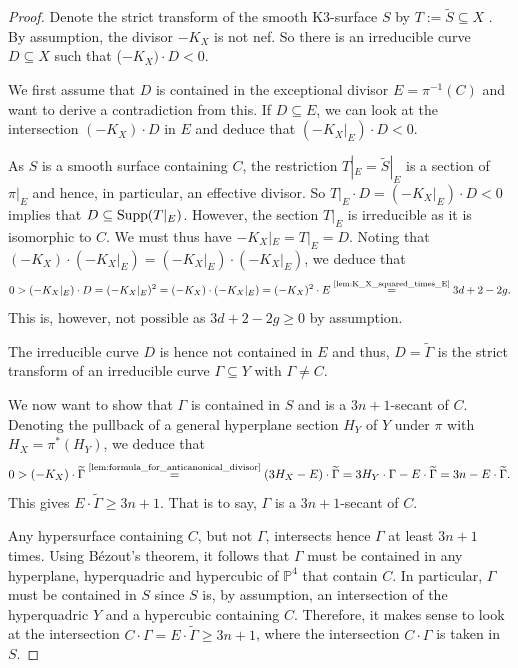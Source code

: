 \documentclass[english,11pt,reqno]{amsart}
\newcommand{\sub}{\subseteq}
\newcommand{\Pfour}{\mathbb{P}^4}
\newcommand{\supp}{\textup{Supp}}
\begin{document}
%
\begin{proof}
Denote the strict transform of the smooth K3-surface $S$ by $T:=\widetilde{S}\sub X$ . By assumption, the divisor $-K_X$ is not nef. So there is an irreducible curve $D\sub X$ such that ($-K_X)\cdot D <0$.\par
We first assume that $D$ is contained in the exceptional divisor $E=\pi^{-1}(C)$ and want to derive a contradiction from this. If $D\sub E$, we can look at the intersection $(-K_X) \cdot D$ in $E$ and deduce that $(-K_X|_E)\cdot D <0$.\par
As $S$ is a smooth surface containing $C$, the restriction $T|_E=\widetilde{S}|_E$ is a section of $\pi|_E$ and hence, in particular, an effective divisor. So $T|_E\cdot D=(-K_X|_E)\cdot D<0$ implies that $D\sub \supp(T|_E)$. However, the section $T|_E$ is irreducible as it is isomorphic to $C$. We must thus have $-K_X|_E=T|_E=D$. Noting that $(-K_X)\cdot (-K_X|_E)=(-K_X|_E)\cdot (-K_X|_E)$, we deduce that
$$0>(-K_X|_E) \cdot D = (-K_X|_E)^2 =(-K_X)\cdot (-K_X|_E) = (-K_X)^2 \cdot E \overset{\textup{\ref{lem:K_X_squared_times_E}}}{=} 3d+2-2g. $$
This is, however, not possible as $3d+2-2g\geq0$ by assumption. \par
The irreducible curve $D$ is hence not contained in $E$ and thus, $D=\widetilde{\Gamma}$ is the strict transform of an irreducible curve $\Gamma \sub Y$ with $\Gamma \neq C$. \par 
We now want to show that $\Gamma$ is contained in $S$ and is a $3n+1$-secant of $C$. Denoting the pullback of a general hyperplane section $H_Y$ of $Y$ under $\pi$ with $H_X=\pi^*(H_Y)$, we deduce that
$$ 0 > (-K_X) \cdot \widetilde{\Gamma} \overset{\textup{\ref{lem:formula_for_anticanonical_divisor}}}{=} (3 H_X - E) \cdot \widetilde{\Gamma} = 3 H_Y \cdot \Gamma - E \cdot \widetilde{\Gamma}= 3n - E \cdot \widetilde{\Gamma}.$$
This gives $E \cdot \widetilde{\Gamma} \geq 3n+1$. That is to say, $\Gamma$ is a $3n+1$-secant of $C$.\par
Any hypersurface containing $C$, but not $\Gamma$, intersects hence $\Gamma $ at least $3n+1$ times. Using Bézout's theorem, it follows that $\Gamma$ must be contained in any hyperplane, hyperquadric and hypercubic of $\Pfour$ that contain $C$. In particular, $\Gamma$ must be contained in $S$ since $S$ is, by assumption, an intersection of the hyperquadric $Y$ and a hypercubic containing $C$. Therefore, it makes sense to look at the intersection $C\cdot \Gamma = E \cdot \widetilde{\Gamma} \geq 3n+1$, where the intersection $C\cdot \Gamma$ is taken in $S$.\par

\end{proof}
\end{document}
